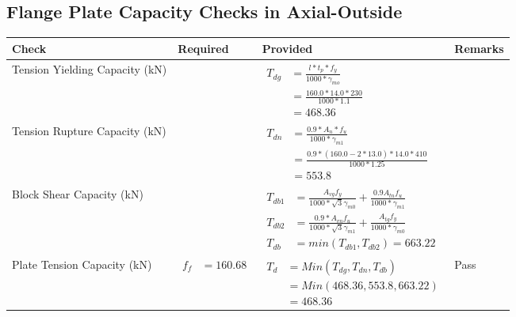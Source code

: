 \documentclass{article}%
\begin{document}
\subsection{Flange Plate Capacity Checks in Axial{-}Outside }%
\label{subsec:FlangePlateCapacityChecksinAxial{-}Outside}%
\renewcommand{\arraystretch}{1.2}%
\begin{longtable}{|p{4cm}|p{6cm}|p{5.5cm}|p{1.5cm}|}%
\hline%
\rowcolor{OsdagGreen}%
Check&Required&Provided&Remarks\\%
\hline%
\endhead%
\hline%
Tension Yielding Capacity (kN)&&$\begin{aligned} T_{dg} &= \frac{l*t_p*f_y}{1000*\gamma_{mo}}\\ &=\frac{160.0*14.0*230}{1000*1.1}\\ &=468.36\end{aligned}$&\\%
\hline%
Tension Rupture Capacity (kN)&&$\begin{aligned} T_{dn} &= \frac{0.9*A_{n}*f_u}{1000*\gamma_{m1}}\\ &=\frac{0.9*(160.0-2*13.0)*14.0*410}{1000*1.25}\\ &=553.8\end{aligned}$&\\%
\hline%
Block Shear Capacity (kN)&&$\begin{aligned}T_{db1} &= \frac{A_{vg} f_{y}}{1000*\sqrt{3} \gamma_{m0}} + \frac{0.9 A_{tn} f_{u}}{1000*\gamma_{m1}}\\ T_{db2} &= \frac{0.9*A_{vn} f_{u}}{1000*\sqrt{3} \gamma_{m1}} + \frac{A_{tg} f_{y}}{1000*\gamma_{m0}}\\ T_{db} &= min(T_{db1}, T_{db2})= 663.22\end{aligned}$&\\%
\hline%
Plate Tension Capacity (kN)&$\begin{aligned} f_f &=160.68 \end{aligned}$&$\begin{aligned} T_d &= Min(T_{dg},T_{dn},T_{db})\\ &= Min(468.36,553.8,663.22)\\ &=468.36\end{aligned}$&Pass\\%
\hline%
\end{longtable}

%
\newpage%
\end{document}
